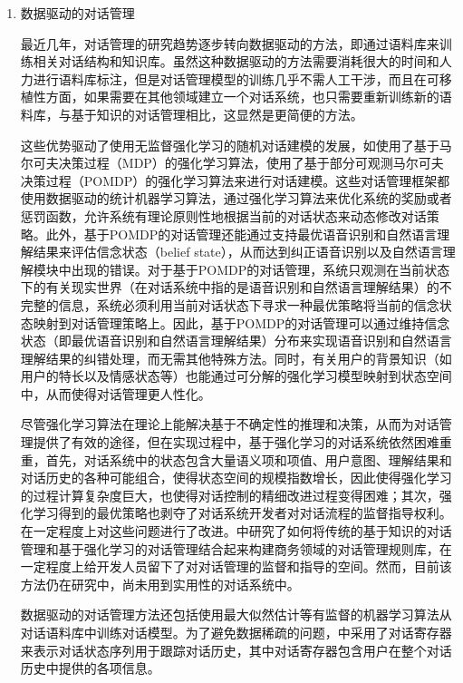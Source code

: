 \begin{enumerate}
\item 数据驱动的对话管理

最近几年，对话管理的研究趋势逐步转向数据驱动的方法，即通过语料库来训练相关对话结构和知识库。虽然这种数据驱动的方法需要消耗很大的时间和人力进行语料库标注，但是对话管理模型的训练几乎不需人工干涉，而且在可移植性方面，如果需要在其他领域建立一个对话系统，也只需要重新训练新的语料库，与基于知识的对话管理相比，这显然是更简便的方法。

这些优势驱动了使用无监督强化学习的随机对话建模的发展，如\cite{Levin2000}使用了基于马尔可夫决策过程（MDP）的强化学习算法，\cite{WilliamsYoung2007, Young2013, Williams2013, Kim2015, Henderson2013}使用了基于部分可观测马尔可夫决策过程（POMDP）的强化学习算法来进行对话建模。这些对话管理框架都使用数据驱动的统计机器学习算法，通过强化学习算法来优化系统的奖励或者惩罚函数，允许系统有理论原则性地根据当前的对话状态来动态修改对话策略。此外，基于POMDP的对话管理还能通过支持最优语音识别和自然语言理解结果来评估信念状态（belief state），从而达到纠正语音识别以及自然语言理解模块中出现的错误。对于基于POMDP的对话管理，系统只观测在当前状态下的有关现实世界（在对话系统中指的是语音识别和自然语言理解结果）的不完整的信息，系统必须利用当前对话状态下寻求一种最优策略将当前的信念状态映射到对话管理策略上。因此，基于POMDP的对话管理可以通过维持信念状态（即最优语音识别和自然语言理解结果）分布来实现语音识别和自然语言理解结果的纠错处理，而无需其他特殊方法。同时，有关用户的背景知识（如用户的特长以及情感状态等）也能通过可分解的强化学习模型映射到状态空间中，从而使得对话管理更人性化。

尽管强化学习算法在理论上能解决基于不确定性的推理和决策，从而为对话管理提供了有效的途径，但在实现过程中，基于强化学习的对话系统依然困难重重\cite{Paek2006}，首先，对话系统中的状态包含大量语义项和项值、用户意图、理解结果和对话历史的各种可能组合，使得状态空间的规模指数增长\cite{Yukai2015}，因此使得强化学习的过程计算复杂度巨大，也使得对话控制的精细改进过程变得困难；其次，强化学习得到的最优策略也剥夺了对话系统开发者对对话流程的监督指导权利。\cite{WilliamsYoung2005, Lemon2006, Young2007, Thomson2008, Williams2008b}在一定程度上对这些问题进行了改进。\cite{Lemon2006, Williams2008b}中研究了如何将传统的基于知识的对话管理和基于强化学习的对话管理结合起来构建商务领域的对话管理规则库，在一定程度上给开发人员留下了对对话管理的监督和指导的空间。然而，目前该方法仍在研究中，尚未用到实用性的对话系统中。

数据驱动的对话管理方法还包括使用最大似然估计等有监督的机器学习算法从对话语料库中训练对话模型\cite{Hurtado2005}。为了避免数据稀疏的问题，\cite{Hurtado2005}中采用了对话寄存器来表示对话状态序列用于跟踪对话历史，其中对话寄存器包含用户在整个对话历史中提供的各项信息。


\end{enumerate}
